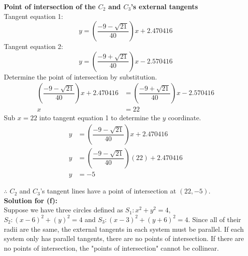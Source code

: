 \documentclass[12pt]{book}
\begin{document}
\begin{enumerate}
\textbf{Point of intersection of the $C_2$ and $C_3$'s external tangents}\\
Tangent equation 1: $$y=\left(\dfrac{-9- \sqrt{21}}{40}\right)x + 2.470416$$
Tangent equation 2: $$y=\left(\dfrac{-9+ \sqrt{21}}{40}\right)x - 2.570416$$
Determine the point of intersection by substitution.
\begingroup
\addtolength{\jot}{0.5em}
\begin{align}
    \left(\dfrac{-9- \sqrt{21}}{40}\right)x + 2.470416 &= \left(\dfrac{-9+ \sqrt{21}}{40}\right)x - 2.570416 \\
    x &= 22
\end{align}
\endgroup
Sub $x=22$ into tangent equation 1 to determine the $y$ coordinate.
\begin{align}
    y &= \left(\dfrac{-9- \sqrt{21}}{40}\right)x + 2.470416 \\
    y &= \left(\dfrac{-9- \sqrt{21}}{40}\right)(22) + 2.470416 \\
    y &= -5
\end{align}

$\therefore$ $C_2$ and $C_3$'s tangent lines have a point of intersection at $(22,-5)$. \\

\textbf{Solution for (f):}\\
Suppose we have three circles defined as $S_1: x^2 + y^2 = 4$, $S_2: \left(x-6\right)^{2}+\left(y\right)^{2}=4$ and $S_3: \left(x-3\right)^{2}+\left(y+6\right)^{2}=4$. Since all of their radii are the same, the external tangents in each system must be parallel. If each system only has parallel tangents, there are no points of intersection. If there are no points of intersection, the "points of intersection" cannot be collinear.





\end{enumerate}
\end{document}
